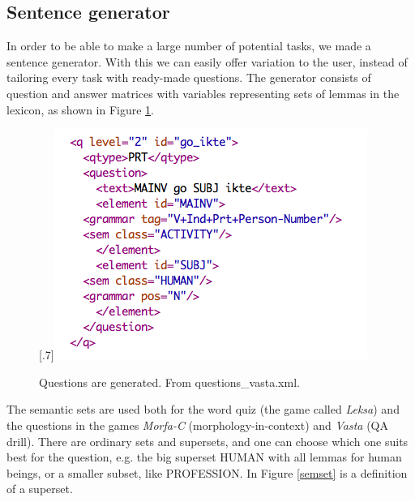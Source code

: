 \documentclass[a4paper,12pt]{article}
\begin{document}

\subsection{Sentence generator}\label{set}
In order to be able to make a large number of potential tasks, we made a sentence generator. With this we can easily offer variation to the user, instead of tailoring every task with ready-made questions. The generator consists of question and answer matrices with variables representing sets of lemmas in the lexicon, as shown in Figure \ref{questionv}.

\begin{figure}[htbp]
\begin{center}
\scalebox{.7}[.7]{\includegraphics{img/question_vasta.png}}\\
\caption{Questions are generated. From questions\_vasta.xml.}
\label{questionv}
\end{center}
\end{figure}

The semantic sets are used both for the word quiz (the game called \textit{Leksa}) and the questions in the games \textit{Morfa-C} (morphology-in-context) and \textit{Vasta} (QA drill). There are ordinary sets and supersets, and one 
can choose which one suits best for the question, e.g. the big superset HUMAN with all lemmas for human beings, or a smaller subset, like PROFESSION. In Figure \ref{semset} is a definition of a superset. 
\end{document}
